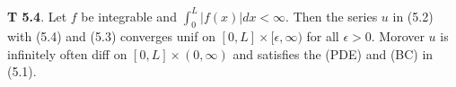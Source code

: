 {\bf T 5.4}. Let $f$ be integrable and $\int_0^L|f(x)|dx < \infty$. Then the series $u$ in (5.2) with (5.4) and (5.3) converges unif on $[0,L] \times [\epsilon,\infty)$ for all $\epsilon >0$. Morover $u$ is infinitely often diff on $[0,L] \times (0, \infty)$ and satisfies the (PDE) and (BC) in (5.1).